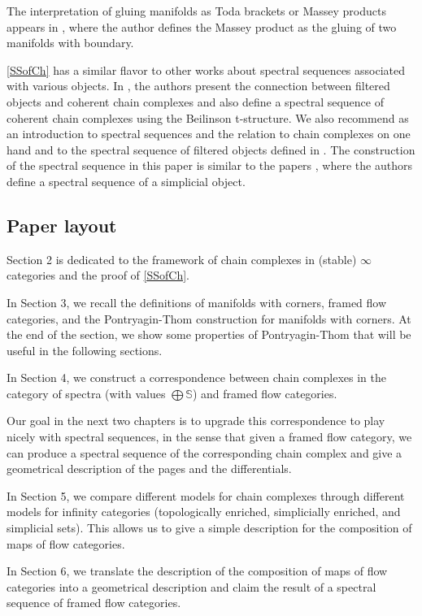 The interpretation of gluing manifolds as Toda brackets or Massey products appears in \cite{alexander1972cobordism}, where the author defines the Massey product as the gluing of two manifolds with boundary.

\cref{SSofCh} has a similar flavor to other works about spectral sequences associated with various objects. In \cite{Ari21}, the authors present the connection between filtered objects and coherent chain complexes and also define a spectral sequence of coherent chain complexes using the Beilinson t-structure. We also recommend \cite{antieau2024spectral} as an introduction to spectral sequences and the relation to chain complexes on one hand and to the spectral sequence of filtered objects defined in \cite{Lur17}.
The construction of the spectral sequence in this paper is similar to the papers \cite{blanc2022spectral}, where the authors define a spectral sequence of a simplicial object.

\subsection*{Paper layout}
Section 2 is dedicated to the framework of chain complexes in (stable) $\infty$ categories and the proof of \cref{SSofCh}.

In Section 3, we recall the definitions of manifolds with corners, framed flow categories, and the Pontryagin-Thom construction for manifolds with corners. At the end of the section, we show some properties of Pontryagin-Thom that will be useful in the following sections.

In Section 4, we construct a correspondence between chain complexes in the category of spectra (with values $\bigoplus \mathbb{S}$) and framed flow categories.

Our goal in the next two chapters is to upgrade this correspondence to play nicely with spectral sequences, in the sense that given a framed flow category, we can produce a spectral sequence of the corresponding chain complex and give a geometrical description of the pages and the differentials.

In Section 5, we compare different models for chain complexes through different models for infinity categories (topologically enriched, simplicially enriched, and simplicial sets). This allows us to give a simple description for the composition of maps of flow categories.

In Section 6, we translate the description of the composition of maps of flow categories into a geometrical description and claim the result of a spectral sequence of framed flow categories.

